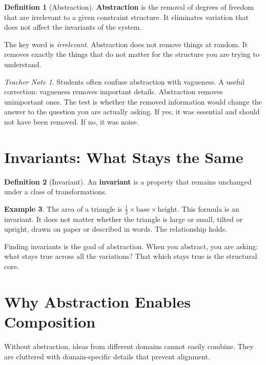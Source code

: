 \documentclass[11pt]{book}
\theoremstyle{definition}
\newtheorem{definition}{Definition}[chapter]
\newtheorem{example}[definition]{Example}
\theoremstyle{remark}
\newtheorem{teachernote}{Teacher Note}[chapter]
\begin{document}
\begin{definition}[Abstraction]
\textbf{Abstraction} is the removal of degrees of freedom that are
irrelevant to a given constraint structure. It eliminates variation that
does not affect the invariants of the system.
\end{definition}

The key word is \emph{irrelevant}. Abstraction does not remove things at
random. It removes exactly the things that do not matter for the structure
you are trying to understand.

\begin{teachernote}
Students often confuse abstraction with vagueness. A useful correction:
vagueness removes important details. Abstraction removes unimportant
ones. The test is whether the removed information would change the answer
to the question you are actually asking. If yes, it was essential and
should not have been removed. If no, it was noise.
\end{teachernote}

\section{Invariants: What Stays the Same}

\begin{definition}[Invariant]
An \textbf{invariant} is a property that remains unchanged under a class
of transformations.
\end{definition}

\begin{example}
The area of a triangle is $\frac{1}{2} \times \text{base} \times \text{height}$.
This formula is an invariant. It does not matter whether the triangle is
large or small, tilted or upright, drawn on paper or described in words.
The relationship holds.
\end{example}

Finding invariants is the goal of abstraction. When you abstract, you are
asking: what stays true across all the variations? That which stays true
is the structural core.

\section{Why Abstraction Enables Composition}

Without abstraction, ideas from different domains cannot easily combine.
They are cluttered with domain-specific details that prevent alignment.
\end{document}
